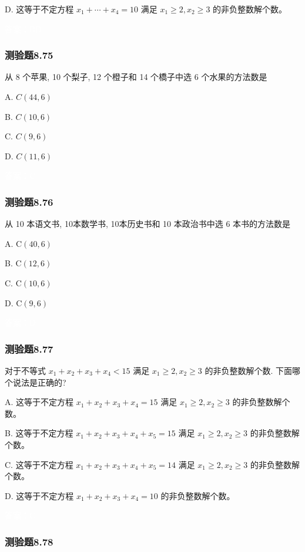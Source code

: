 \documentclass[UTF8, heading=true]{ctexart}
\begin{document}
D. 这等于不定方程 $x_1+\cdots+x_4=10$ 满足 $x_1 \geq 2, x_2 \geq 3$ 的非负整数解个数。

\textcolor{white}{答案：BD}

\subsubsection{测验题8.75}

从 8 个苹果, 10 个梨子, 12 个橙子和 14 个橋子中选 6 个水果的方法数是

A. $ C(44,6)$

B. $ C(10,6)$

C. $ C(9,6)$

D. $ C(11,6)$

\textcolor{white}{答案：C}


\subsubsection{测验题8.76}

从 10 本语文书, 10本数学书, 10本历史书和 10 本政治书中选 6 本书的方法数是

A. $\mathrm{C}(40,6)$

B. $\mathrm{C}(12,6)$

C. $\mathrm{C}(10,6)$

D. $\mathrm{C}(9,6)$

\textcolor{white}{答案：D}

\subsubsection{测验题8.77}

对于不等式 $x_1+x_2+x_3+x_4<15$ 满足 $x_1 \geq 2, x_2 \geq 3$ 的非负整数解个数. 下面哪个说法是正确的?

A. 这等于不定方程 $x_1+x_2+x_3+x_4=15$ 满足 $x_1 \geq 2, x_2 \geq 3$ 的非负整数解个数。

B. 这等于不定方程 $x_1+x_2+x_3+x_4+x_5=15$ 满足 $x_1 \geq 2, x_2 \geq 3$ 的非负整数解个数。

C. 这等于不定方程 $x_1+x_2+x_3+x_4+x_5=14$ 满足 $x_1 \geq 2, x_2 \geq 3$ 的非负整数解个数。

D. 这等于不定方程 $x_1+x_2+x_3+x_4=10$ 的非负整数解个数。

\textcolor{white}{答案：C}

\subsubsection{测验题8.78}
\end{document}
